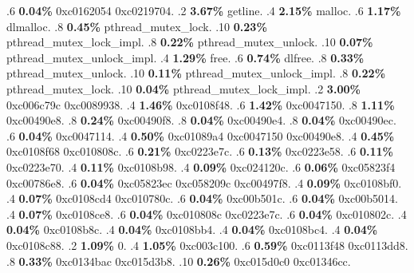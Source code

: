 \begin{profile}
{.6 \textbf{0.04\%} 0xc0162054\newline {} 0xc0219704. 
.2 \textbf{3.67\%} getline. 
.4 \textbf{2.15\%} malloc. 
.6 \textbf{1.17\%} dlmalloc. 
.8 \textbf{0.45\%} pthread\_mutex\_lock. 
.10 \textbf{0.23\%} pthread\_mutex\_lock\_impl. 
.8 \textbf{0.22\%} pthread\_mutex\_unlock. 
.10 \textbf{0.07\%} pthread\_mutex\_unlock\_impl. 
.4 \textbf{1.29\%} free. 
.6 \textbf{0.74\%} dlfree. 
.8 \textbf{0.33\%} pthread\_mutex\_unlock. 
.10 \textbf{0.11\%} pthread\_mutex\_unlock\_impl. 
.8 \textbf{0.22\%} pthread\_mutex\_lock. 
.10 \textbf{0.04\%} pthread\_mutex\_lock\_impl. 
.2 \textbf{3.00\%} 0xc006c79c\newline {} 0xc0089938. 
.4 \textbf{1.46\%} 0xc0108f48. 
.6 \textbf{1.42\%} 0xc0047150. 
.8 \textbf{1.11\%} 0xc00490e8. 
.8 \textbf{0.24\%} 0xc00490f8. 
.8 \textbf{0.04\%} 0xc00490e4. 
.8 \textbf{0.04\%} 0xc00490ec. 
.6 \textbf{0.04\%} 0xc0047114. 
.4 \textbf{0.50\%} 0xc01089a4\newline {} 0xc0047150\newline {} 0xc00490e8. 
.4 \textbf{0.45\%} 0xc0108f68\newline {} 0xc010808c. 
.6 \textbf{0.21\%} 0xc0223e7c. 
.6 \textbf{0.13\%} 0xc0223e58. 
.6 \textbf{0.11\%} 0xc0223e70. 
.4 \textbf{0.11\%} 0xc0108b98. 
.4 \textbf{0.09\%} 0xc024120c. 
.6 \textbf{0.06\%} 0xc05823f4\newline {} 0xc00786e8. 
.6 \textbf{0.04\%} 0xc05823ec\newline {} 0xc058209c\newline {} 0xc00497f8. 
.4 \textbf{0.09\%} 0xc0108bf0. 
.4 \textbf{0.07\%} 0xc0108cd4\newline {} 0xc010780c. 
.6 \textbf{0.04\%} 0xc00b501c. 
.6 \textbf{0.04\%} 0xc00b5014. 
.4 \textbf{0.07\%} 0xc0108ce8. 
.6 \textbf{0.04\%} 0xc010808c\newline {} 0xc0223e7c. 
.6 \textbf{0.04\%} 0xc010802c. 
.4 \textbf{0.04\%} 0xc0108b8c. 
.4 \textbf{0.04\%} 0xc0108bb4. 
.4 \textbf{0.04\%} 0xc0108bc4. 
.4 \textbf{0.04\%} 0xc0108c88. 
.2 \textbf{1.09\%} 0. 
.4 \textbf{1.05\%} 0xc003c100. 
.6 \textbf{0.59\%} 0xc0113f48\newline {} 0xc0113dd8. 
.8 \textbf{0.33\%} 0xc0134bac\newline {} 0xc015d3b8. 
.10 \textbf{0.26\%} 0xc015d0c0\newline {} 0xc01346cc. 
}
\end{profile}
